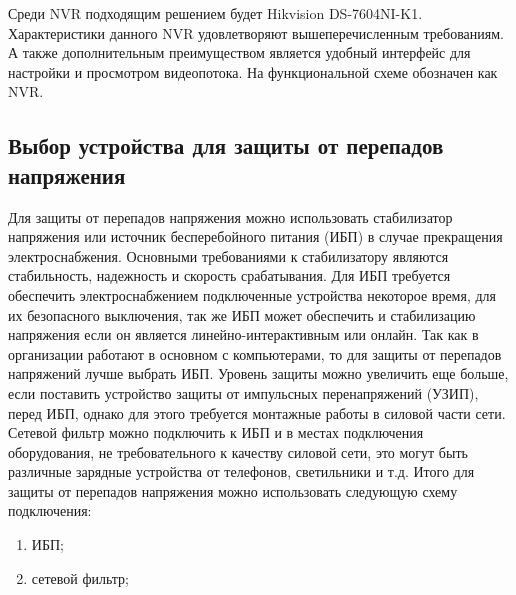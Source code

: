 Среди NVR подходящим решением будет Hikvision DS-7604NI-K1. Характеристики данного NVR удовлетворяют вышеперечисленным требованиям. А также дополнительным преимуществом
является удобный интерфейс для настройки и просмотром видеопотока. На функциональной схеме обозначен как NVR.


\subsection{Выбор устройства для защиты от перепадов напряжения}

Для защиты от перепадов напряжения можно использовать стабилизатор напряжения или источник бесперебойного питания (ИБП) в случае прекращения электроснабжения.
Основными требованиями к стабилизатору являются стабильность, надежность и скорость срабатывания. Для ИБП требуется обеспечить 
электроснабжением подключенные устройства некоторое время, для их безопасного выключения, 
так же ИБП может обеспечить и стабилизацию напряжения если он является линейно-интерактивным
или онлайн. 
Так как в организации
работают в основном с компьютерами, то для защиты от перепадов напряжений лучше выбрать ИБП. Уровень защиты можно увеличить еще больше,
если поставить устройство защиты от импульсных перенапряжений (УЗИП), перед ИБП, однако для этого требуется монтажные работы в силовой части сети.
Сетевой фильтр можно подключить к ИБП и в местах подключения оборудования, не требовательного к качеству силовой сети, это могут быть различные зарядные устройства от телефонов, светильники и т.д.
Итого для защиты от перепадов напряжения можно использовать следующую схему подключения:

\begin{enumerate}
    \item ИБП;
    \item сетевой фильтр;
\end{enumerate}

